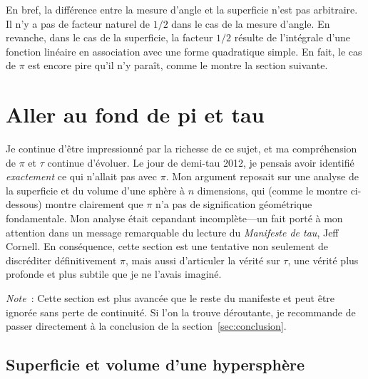 En bref, la différence entre la mesure d'angle et la superficie n'est pas
arbitraire. \linebreak Il n'y a pas de facteur naturel de $1/2$ dans le cas
de la mesure d'angle. En revanche, dans le cas de la superficie, la facteur $1/2$ résulte de l'intégrale d'une fonction linéaire en association avec une forme quadratique simple. En fait, le cas de $\pi$ est encore pire qu'il n'y paraît, comme le montre la section suivante.


\section{Aller au fond de pi et tau} %
\label{sec:getting_to_the_bottom_of_pi}

Je continue d'être impressionné par la richesse de ce sujet, et ma compréhension de $\pi$ et $\tau$ continue d'évoluer. Le jour de demi-tau 2012, je pensais avoir identifié \emph{exactement} ce qui n'allait pas avec $\pi$. Mon argument reposait sur une analyse de la superficie et du volume d'une sphère à $n$ dimensions, qui (comme le montre ci-dessous) montre clairement que $\pi$ n'a pas de signification géométrique fondamentale. Mon analyse était cepandant incomplète---un fait porté à mon attention dans un message remarquable du lecture du \emph{Manifeste de tau}, Jeff Cornell. En conséquence, cette section est une tentative non seulement de discréditer définitivement $\pi$, mais aussi d'articuler la vérité sur $\tau$, une vérité plus profonde et plus subtile que je ne l'avais imaginé.

\emph{Note}~: Cette section est plus avancée que le reste du manifeste et peut être ignorée sans perte de continuité. Si l'on la trouve déroutante, je recommande de passer directement à la conclusion de la section~\ref{sec:conclusion}.

  \subsection{Superficie et volume d'une hypersphère} %
  \label{sec:volume_of_a_hypersphere}

